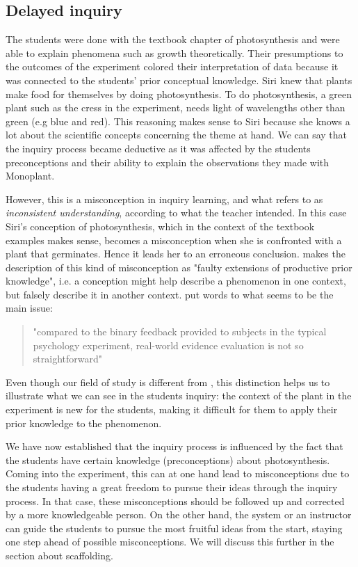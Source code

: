 \subsection{Delayed inquiry}
The students were done with the textbook chapter of photosynthesis and were able to explain  phenomena such as growth theoretically. Their presumptions to the outcomes of the experiment colored their interpretation of data because it was connected to the students' prior conceptual knowledge. Siri knew that plants make food for themselves by doing photosynthesis. To do photosynthesis, a green plant such as the cress in the experiment, needs light of wavelengths other than green (e.g blue and red). This reasoning makes sense to Siri because she knows a lot about the scientific concepts concerning the theme at hand. We can say that the inquiry process became deductive as it was affected by the students preconceptions and their ability to explain the observations they made with Monoplant. 

However, this is a misconception in inquiry learning, and what \citet{gomez2008elementary} refers to as \emph{inconsistent understanding}, according to what the teacher intended. In this case Siri's conception of photosynthesis, which in the context of the textbook examples makes sense, becomes a misconception when she is confronted with a plant that germinates. Hence it leads her to an erroneous conclusion. \citet{smith1994misconceptions} makes the description of this kind of misconception as "faulty extensions of productive prior knowledge", i.e. a conception might help describe a phenomenon in one context, but falsely describe it in another context. \citeauthor*{klahr1993heuristics} put words to what seems to be the main issue: 

\begin{quote}"compared to the binary feedback provided to subjects in the typical psychology experiment, real-world evidence evaluation is not so straightforward" \citetext{\citet[p. 114]{klahr1993heuristics}, referenced in \citealp{de1998scientific}}
\end{quote}

Even though our field of study is different from \citeauthor{klahr1993heuristics}, this distinction helps us to illustrate what we can see in the students inquiry: the context of the plant in the experiment is new for the students, making it difficult for them to apply their prior knowledge to the phenomenon.  

We have now established that the inquiry process is influenced by the fact that the students have certain knowledge (preconceptions) about photosynthesis. Coming into the experiment, this can at one hand lead to misconceptions due to the students having a great freedom to pursue their ideas through the inquiry process. In that case, these misconceptions should be followed up and corrected by a more knowledgeable person. On the other hand, the system or an instructor can guide the students to pursue the most fruitful ideas from the start, staying one step ahead of possible misconceptions. We will discuss this further in the section about scaffolding.



